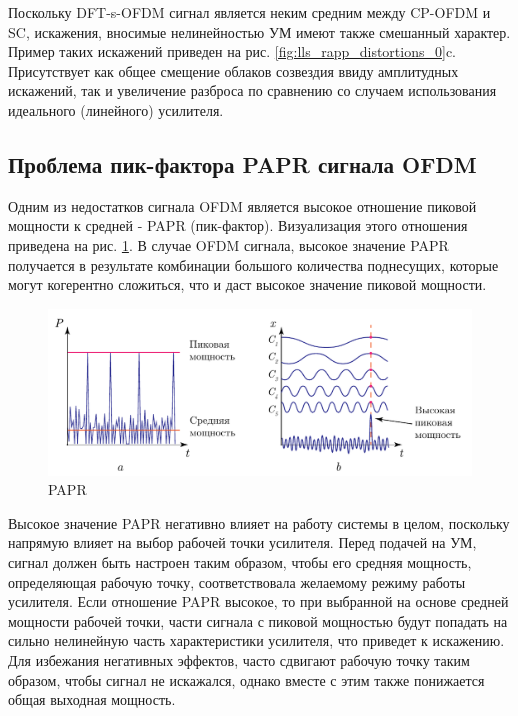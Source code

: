 Поскольку DFT-s-OFDM сигнал является неким средним между CP-OFDM и SC,
искажения, вносимые нелинейностью УМ имеют также смешанный характер. Пример
таких искажений приведен на рис. \ref{fig:lls_rapp_distortions_0}c.
Присутствует как общее смещение облаков созвездия ввиду амплитудных
искажений, так и увеличение разброса по сравнению со случаем
использования идеального (линейного) усилителя.

\subsection{Проблема пик-фактора PAPR сигнала OFDM}
\label{sec:papr}
Одним из недостатков сигнала OFDM является высокое отношение пиковой
мощности к средней - PAPR (пик-фактор). Визуализация этого отношения приведена на рис.
\ref{fig:papr}. В случае OFDM сигнала, высокое значение PAPR получается в
результате комбинации большого количества поднесущих, которые могут
когерентно сложиться, что и даст высокое значение пиковой мощности.
 
\begin{figure}[h!]
    \centering
    \includegraphics[scale=1]{figs/papr_explanation.pdf}
    \caption{PAPR}
    \label{fig:papr}
\end{figure}
Высокое значение PAPR негативно влияет на работу системы в целом, поскольку
напрямую влияет на выбор рабочей точки усилителя. Перед подачей на УМ,
сигнал должен быть настроен таким образом, чтобы его средняя мощность,
определяющая рабочую точку, соответствовала желаемому режиму работы
усилителя. Если отношение PAPR высокое, то при выбранной на основе средней
мощности рабочей точки, части сигнала с пиковой мощностью будут попадать на
сильно нелинейную часть характеристики усилителя, что приведет к
искажению. Для избежания негативных эффектов, часто сдвигают рабочую точку
таким образом, чтобы сигнал не искажался, однако вместе с этим также
понижается общая выходная мощность.

